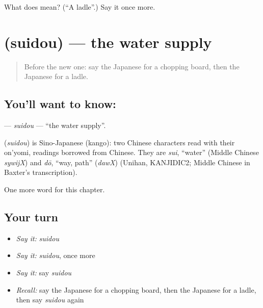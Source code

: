 \begin{tcolorbox}[breakable,colback=teal!4,colframe=teal!35!black,title={Before you move on}]
What does  mean? (\textquotedblleft{}A ladle\textquotedblright{}.) Say it once more.
\end{tcolorbox}
\section[\texorpdfstring{\ja{すいどう} (suidou)}{すいどう (suidou)}]{ (suidou) — the water supply}

\label{lesson:JA-C103-suidou}



\begin{quote}
Before the new one: say the Japanese for a chopping board, then the Japanese for a ladle.
\end{quote}

\subsection*{You'll want to know: }
\textbf{} — \emph{suidou} — \textquotedblleft{}the water supply\textquotedblright{}.

\begin{cousinweb}
\textbf{} (\emph{suidou}) is Sino-Japanese (kango): two Chinese characters read with their on'yomi, readings borrowed from Chinese. They are \emph{sui}, \textquotedblleft{}water\textquotedblright{} (Middle Chinese \emph{sywijX}) and \emph{dō}, \textquotedblleft{}way, path\textquotedblright{} (\emph{dawX}) (Unihan, KANJIDIC2; Middle Chinese in Baxter's transcription).
\end{cousinweb}

\begin{grammarlens}[title={What you've built}]
One more word for this chapter.
\end{grammarlens}

\subsection*{Your turn}
\begin{itemize}
\raggedright
  \item \emph{Say it:} \emph{suidou}
  \item \emph{Say it:} \emph{suidou}, once more
  \item \emph{Say it:} say \emph{suidou}
  \item \emph{Recall:} say the Japanese for a chopping board, then the Japanese for a ladle, then say \emph{suidou} again
\end{itemize}

